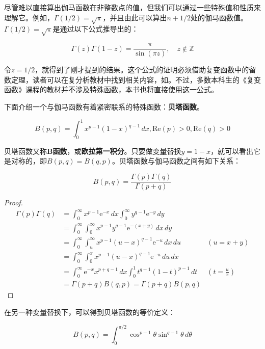 \documentclass{ctexbook}
\begin{document}
尽管难以直接算出伽马函数在非整数点的值，但我们可以通过一些特殊值和性质来理解它。例如，$\Gamma(1/2)=\sqrt{\pi}$，并且由此可以算出$n+1/2$处的伽马函数值。$\Gamma(1/2)=\sqrt{\pi}$是通过以下公式推导出的：
\begin{claim}[余元公式]
    \[\Gamma (z)\Gamma (1-z)=\frac{\pi}{\sin(\pi z)},\quad z\notin \mathbb{Z}\]
\end{claim}

令$z=1/2$，就得到了刚才提到的结果。这个公式的证明必须借助复变函数中的留数定理，读者可以在复分析教材中找到相关内容，如\cite{Function_Theory}。不过，多数本科生的《复变函数》课程的教材并不涉及特殊函数，本书也将直接使用这一公式。

下面介绍一个与伽马函数有着紧密联系的特殊函数：\textbf{贝塔函数}。

\begin{definition}[贝塔函数]
    \[B(p,q)=\int_{0}^{1}x^{p-1}(1-x)^{q-1}\,dx,\text{Re}(p)>0,\text{Re}(q)>0\]
\end{definition}
贝塔函数又称\textbf{B函数}，或\textbf{欧拉第一积分}。只要做变量替换$y=1-x$，就可以看出它是对称的，即$B(p,q)=B(q,p)$。贝塔函数与伽马函数之间有如下关系：
\begin{theorem}
    \[B(p,q)=\frac{\Gamma (p)\Gamma (q)}{\Gamma (p+q)}\]
\end{theorem}
\begin{proof}
    \begin{align*}
    \Gamma (p)\Gamma (q)&=\int_{0}^{\infty}x^{p-1}\mathrm{e}^{-x}\,dx\int_{0}^{\infty}y^{q-1}\mathrm{e}^{-y}\,dy\\
    &=\int_{0}^{\infty}\int_{0}^{\infty}x^{p-1}y^{q-1}\mathrm{e}^{-(x+y)}\,dx\,dy\\
    &=\int_{0}^{\infty}\int_{u}^{\infty}x^{p-1}(u-x)^{q-1}\mathrm{e}^{-u}\,dx\,du&(u=x+y)\\
    &=\int_{0}^{\infty}\int_{0}^{x}x^{p-1}(u-x)^{q-1}\mathrm{e}^{-u}\,du\,dx\\
    &=\int_{0}^{\infty}\mathrm{e}^{-x}x^{p+q-1}\,dx\int_{0}^{1}t^{q-1}(1-t)^{p-1}\,dt&\left(t=\frac{u}{x}\right)\\
    &=\Gamma (p+q)B(q,p)=\Gamma (p+q)B(p,q)
    \end{align*}
\end{proof}

在另一种变量替换下，可以得到贝塔函数的等价定义：
\begin{definition}[贝塔函数的等价定义]
    \[B(p,q)=\int_{0}^{\pi/2}\cos^{p-1}\theta\sin^{q-1}\theta\,d\theta\]
\end{definition}
\end{document}
